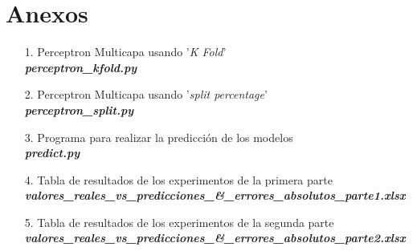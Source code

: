 \documentclass[12pt,a4paper, xcolor=table]{article}
\begin{document}
  \section{Anexos}
  \begin{itemize}
    \item [1.] Perceptron Multicapa usando '\textit{K Fold}'\\
    \textbf{\textit{perceptron\_kfold.py}}
    \item [2.] Perceptron Multicapa usando '\textit{split percentage}'\\
    \textbf{\textit{perceptron\_split.py}}
    \item [3.] Programa para realizar la predicción de los modelos\\
    \textbf{\textit{predict.py}}
    \item [4.] Tabla de resultados de los experimentos de la primera parte\\
    \textbf{\textit{valores\_reales\_vs\_predicciones\_\&\_errores\_absolutos\_parte1.xlsx}}
    \item [5.] Tabla de resultados de los experimentos de la segunda parte\\
    \textbf{\textit{valores\_reales\_vs\_predicciones\_\&\_errores\_absolutos\_parte2.xlsx}}
  \end{itemize}
\end{document}
